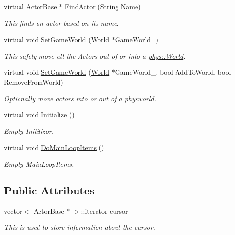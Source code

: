 \begin{DoxyCompactItemize}
virtual \hyperlink{classphys_1_1ActorBase}{ActorBase} $\ast$ \hyperlink{classphys_1_1ActorContainerVector_ae04f8c6dd9b07ef9c1456707be9e155b}{FindActor} (\hyperlink{namespacephys_aa03900411993de7fbfec4789bc1d392e}{String} Name)
\begin{DoxyCompactList}\small\item\em This finds an actor based on its name. \item\end{DoxyCompactList}\item 
virtual void \hyperlink{classphys_1_1ActorContainerVector_ab4c1394254057465f7a2f89b87dc49aa}{SetGameWorld} (\hyperlink{classphys_1_1World}{World} $\ast$GameWorld\_\-)
\begin{DoxyCompactList}\small\item\em This safely move all the Actors out of or into a \hyperlink{classphys_1_1World}{phys::World}. \item\end{DoxyCompactList}\item 
virtual void \hyperlink{classphys_1_1ActorContainerVector_a721d0cde6fc4f1e8d3b33867cd5c82df}{SetGameWorld} (\hyperlink{classphys_1_1World}{World} $\ast$GameWorld\_\-, bool AddToWorld, bool RemoveFromWorld)
\begin{DoxyCompactList}\small\item\em Optionally move actors into or out of a physworld. \item\end{DoxyCompactList}\item 
virtual void \hyperlink{classphys_1_1ActorContainerVector_adcebf4329a587669f74e1eacc1e6912c}{Initialize} ()
\begin{DoxyCompactList}\small\item\em Empty Initilizor. \item\end{DoxyCompactList}\item 
virtual void \hyperlink{classphys_1_1ActorContainerVector_a883e59ac1674421bac143088a6cf07c8}{DoMainLoopItems} ()
\begin{DoxyCompactList}\small\item\em Empty MainLoopItems. \item\end{DoxyCompactList}\end{DoxyCompactItemize}
\subsection*{Public Attributes}
\begin{DoxyCompactItemize}
\item 
vector$<$ \hyperlink{classphys_1_1ActorBase}{ActorBase} $\ast$ $>$::iterator \hyperlink{classphys_1_1ActorContainerVector_a08bdad9b15e265b5d44470f21766b6ed}{cursor}
\begin{DoxyCompactList}\small\item\em This is used to store information about the cursor. \item\end{DoxyCompactList}\end{DoxyCompactItemize}


